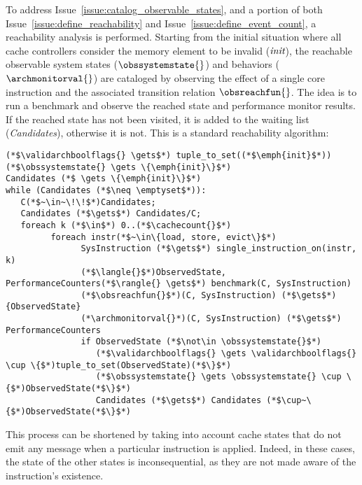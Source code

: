 \begin{step}
\label{step:reachability}
   To address Issue~\ref{issue:catalog_observable_states}, and a portion of both
   Issue~\ref{issue:define_reachability} and
   Issue~\ref{issue:define_event_count}, a reachability analysis is performed.
   Starting from the initial situation where all cache controllers consider the
   memory element to be invalid ($\emph{init}$), the reachable observable system
   states ($\obssystemstate{}$) and behaviors ($\archmonitorval{}$) are
   cataloged by observing the effect of a single core instruction and the
   associated transition relation $\obsreachfun{}$. The idea is to run a
   benchmark and observe the reached state and performance monitor results.  If
   the reached state has not been visited, it is added to the waiting list
   (\textit{Candidates}), otherwise it is not. This is a standard reachability
   algorithm:
\begin{lstlisting}
(*$\validarchboolflags{} \gets$*) tuple_to_set((*$\emph{init}$*))
(*$\obssystemstate{} \gets \{\emph{init}\}$*)
Candidates (*$ \gets \{\emph{init}\}$*)
while (Candidates (*$\neq \emptyset$*)):
   C(*$~\in~\!\!$*)Candidates;
   Candidates (*$\gets$*) Candidates/C;
   foreach k (*$\in$*) 0..(*$\cachecount{}$*)
         foreach instr(*$~\in\{load, store, evict\}$*)
               SysInstruction (*$\gets$*) single_instruction_on(instr, k)
               (*$\langle{}$*)ObservedState, PerformanceCounters(*$\rangle{} \gets$*) benchmark(C, SysInstruction)
               (*$\obsreachfun{}$*)(C, SysInstruction) (*$\gets$*) {ObservedState}
               (*\archmonitorval{}*)(C, SysInstruction) (*$\gets$*) PerformanceCounters
               if ObservedState (*$\not\in \obssystemstate{}$*)
                  (*$\validarchboolflags{} \gets \validarchboolflags{} \cup \{$*)tuple_to_set(ObservedState)(*$\}$*)
                  (*$\obssystemstate{} \gets \obssystemstate{} \cup \{$*)ObservedState(*$\}$*)
                  Candidates (*$\gets$*) Candidates (*$\cup~\{$*)ObservedState(*$\}$*)
\end{lstlisting}
This process can be shortened by taking into account cache states that do not
emit any message when a particular instruction is applied. Indeed, in these
cases, the state of the other states is inconsequential, as they are not made
aware of the instruction's existence.
\end{step}

